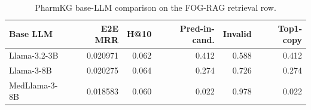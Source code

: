 \begin{table}[t]
\centering
\small
\begin{tabular}{lrrrrr}
\hline
Base LLM & E2E MRR & H@10 & Pred-in-cand. & Invalid & Top1-copy \\
\hline
Llama-3.2-3B & 0.020971 & 0.062 & 0.412 & 0.588 & 0.412 \\
Llama-3-8B & 0.020275 & 0.064 & 0.274 & 0.726 & 0.274 \\
MedLlama-3-8B & 0.018583 & 0.060 & 0.022 & 0.978 & 0.022 \\
\hline
\end{tabular}
\caption{PharmKG base-LLM comparison on the FOG-RAG retrieval row.}
\label{tab:pharmkg-model-comparison}
\end{table}
